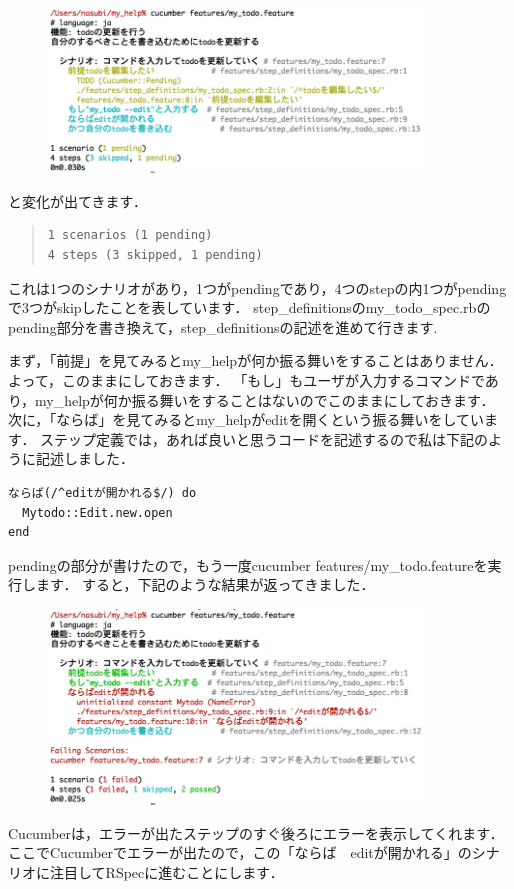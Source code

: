 \begin{figure}[htbp]\begin{center}
\includegraphics[width=10cm,bb= 0 0 737 453]{../figs/./cucumber2.jpg}
\caption{}
\label{default}\end{center}\end{figure}
と変化が出てきます．
\begin{quote}\begin{verbatim}
1 scenarios (1 pending)
4 steps (3 skipped, 1 pending)
\end{verbatim}\end{quote}
これは1つのシナリオがあり，1つがpendingであり，4つのstepの内1つがpendingで3つがskipしたことを表しています．
step\_definitionsのmy\_todo\_spec.rbのpending部分を書き換えて，step\_definitionsの記述を進めて行きます.

まず，「前提」を見てみるとmy\_helpが何か振る舞いをすることはありません．
よって，このままにしておきます．
「もし」もユーザが入力するコマンドであり，my\_helpが何か振る舞いをすることはないのでこのままにしておきます．
次に，「ならば」を見てみるとmy\_helpがeditを開くという振る舞いをしています．
ステップ定義では，あれば良いと思うコードを記述するので私は下記のように記述しました．
\begin{lstlisting}[style=customCsh]
ならば(/^editが開かれる$/) do
  Mytodo::Edit.new.open
end
\end{lstlisting}
pendingの部分が書けたので，もう一度cucumber features/my\_todo.featureを実行します．
すると，下記のような結果が返ってきました．

\begin{figure}[htbp]\begin{center}
\includegraphics[width=10cm,bb= 0 0 737 453]{../figs/./cucumber3.jpg}
\caption{}
\label{default}\end{center}\end{figure}
Cucumberは，エラーが出たステップのすぐ後ろにエラーを表示してくれます．
ここでCucumberでエラーが出たので，この「ならば　editが開かれる」のシナリオに注目してRSpecに進むことにします．

